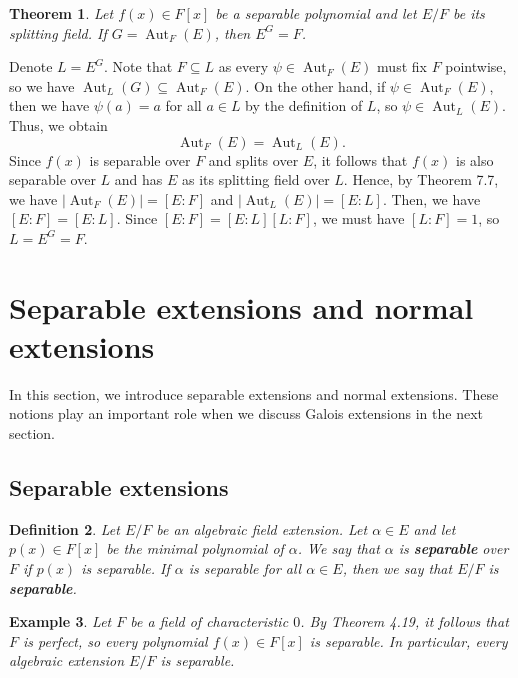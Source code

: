 \documentclass[10pt]{article}
\makeatletter
\DeclareMathOperator{\Aut}{Aut}
\theoremstyle{newstyle}
\newtheorem{thm}{Theorem}[section]
\newtheorem{defn}[thm]{Definition}
\newtheorem{exmp}[thm]{Example}
\newenvironment{pf}[1][\proofname]{\par
  \pushQED{\qed}%
  \normalfont \topsep0\p@\relax
  \trivlist
  \item[\hskip\labelsep\scshape
  #1\@addpunct{.}]\ignorespaces
}{%
  \popQED\endtrivlist\@endpefalse
}
\makeatother
\begin{document}
\begin{thm}
Let $f(x) \in F[x]$ be a separable polynomial and let $E/F$ be its splitting field. 
If $G = \Aut_F(E)$, then $E^G = F$. 
\end{thm}
\begin{pf}
Denote $L = E^G$. Note that $F \subseteq L$ as every $\psi \in \Aut_F(E)$ must fix $F$ pointwise, 
so we have $\Aut_L(G) \subseteq \Aut_F(E)$. On the other hand, if $\psi \in \Aut_F(E)$, 
then we have $\psi(a) = a$ for all $a \in L$ by the definition of $L$, so 
$\psi \in \Aut_L(E)$. Thus, we obtain 
\[ \Aut_F(E) = \Aut_L(E). \]
Since $f(x)$ is separable over $F$ and splits over $E$, it follows that $f(x)$ is 
also separable over $L$ and has $E$ as its splitting field over $L$. 
Hence, by Theorem 7.7, we have $\lvert\Aut_F(E)\rvert = [E : F]$ and 
$\lvert\Aut_L(E)\rvert = [E : L]$. Then, we have $[E : F] = [E : L]$. 
Since $[E : F] = [E : L][L : F]$, we must have $[L : F] = 1$, so 
$L = E^G = F$. 
\end{pf}

\newpage 
\section{Separable extensions and normal extensions}

In this section, we introduce separable extensions and normal extensions. These 
notions play an important role when we discuss Galois extensions in the next section. 

\subsection{Separable extensions}

\begin{defn}
Let $E/F$ be an algebraic field extension. Let $\alpha \in E$ and let $p(x) \in F[x]$ 
be the minimal polynomial of $\alpha$. We say that $\alpha$ is {\bf separable} 
over $F$ if $p(x)$ is separable. If $\alpha$ is separable for all $\alpha \in E$, then 
we say that $E/F$ is {\bf separable}. 
\end{defn}

\begin{exmp}
Let $F$ be a field of characteristic $0$. By Theorem 4.19, it follows that $F$ is perfect, so every
polynomial $f(x) \in F[x]$ is separable. In particular, every algebraic extension $E/F$ is separable. 
\end{exmp}
\end{document}
